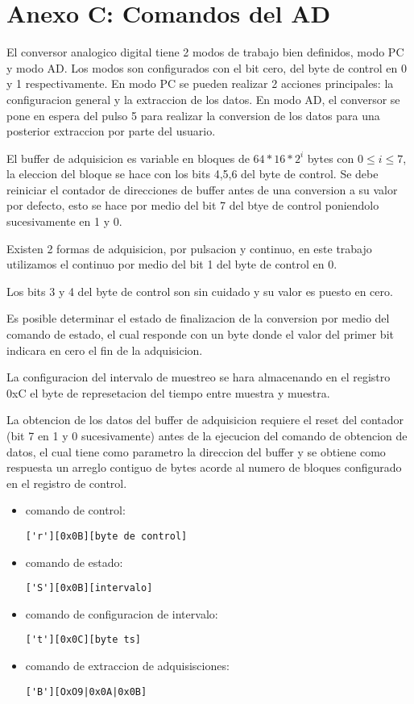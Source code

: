 \section{Anexo C: Comandos del AD}

El conversor analogico digital tiene 2 modos de trabajo bien definidos, modo PC y modo AD. 
Los modos son configurados con el bit cero, del byte de control en 0 y 1 respectivamente.
En modo PC se pueden realizar 2 acciones principales: la configuracion general y la extraccion de los datos.
En modo AD, el conversor se pone en espera del pulso 5 para realizar la conversion de los datos para una posterior extraccion por parte del usuario.

El buffer de adquisicion es variable en bloques de $64*16*2^{i}$ bytes con $0 \leq i \leq 7$, la eleccion
del bloque se hace con los bits 4,5,6 del byte de control.
Se debe reiniciar el contador de direcciones de buffer antes de una conversion a su valor por defecto,
esto se hace por medio del bit 7 del btye de control poniendolo sucesivamente en 1 y 0. 

Existen 2 formas de adquisicion, por pulsacion y continuo, en este trabajo utilizamos el continuo por 
medio del bit 1 del byte de control en 0.

Los bits 3 y 4 del byte de control son sin cuidado y su valor es puesto en cero.

Es posible determinar el estado de finalizacion de la conversion por medio del comando de estado, 
el cual responde con un byte donde el valor del primer bit indicara en cero el fin de la adquisicion.

La configuracion del intervalo de muestreo se hara almacenando en el registro 0xC el byte
de represetacion del tiempo entre muestra y muestra.

La obtencion de los datos del buffer de adquisicion requiere el reset del contador (bit 7 en 1 y 0 sucesivamente)
antes de la ejecucion del comando de obtencion de datos, el cual tiene como parametro la direccion del 
buffer y se obtiene como respuesta un arreglo contiguo de bytes acorde al numero de bloques configurado
en el registro de control.

\begin{itemize}
\item comando de control: \begin{verbatim}['r'][0x0B][byte de control]\end{verbatim}
\item comando de estado: \begin{verbatim}['S'][0x0B][intervalo]\end{verbatim}
\item comando de configuracion de intervalo: \begin{verbatim}['t'][0x0C][byte ts]\end{verbatim}
\item comando de extraccion de adquisisciones: \begin{verbatim}['B'][OxO9|0x0A|0x0B]\end{verbatim}
\end{itemize}

\newpage
